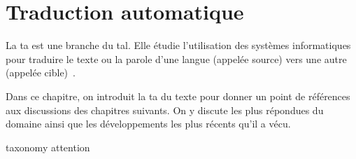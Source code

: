 \chapter{Traduction automatique}


La \acrfull{ta} est une branche du \acrfull{tal}.
Elle étudie l'utilisation des systèmes informatiques pour traduire le texte ou la parole d'une langue (appelée source) vers une autre (appelée cible)~\cite{routledge}.

Dans ce chapitre, on introduit la \acrlong{ta} du texte pour donner un point de références aux discussions des chapitres suivants.
On y discute les plus répondues du domaine 
ainsi que les développements les plus récents qu'il a vécu.

{taxonomy}
{attention}